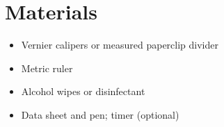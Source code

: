 \section{Materials}
\begin{itemize}[leftmargin=*]
  \item Vernier calipers or measured paperclip divider
  \item Metric ruler
  \item Alcohol wipes or disinfectant
  \item Data sheet and pen; timer (optional)
\end{itemize}
